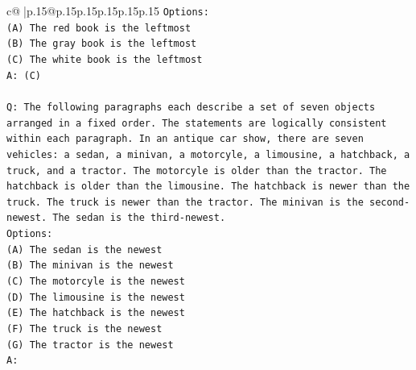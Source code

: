 \documentclass{article}
\begin{document}
{\begin{supertabular}{c@{$\;$}|p{.15\linewidth}@{}p{.15\linewidth}p{.15\linewidth}p{.15\linewidth}p{.15\linewidth}p{.15\linewidth}}
{{{\texttt{Options:} \\
\texttt{(A) The red book is the leftmost} \\
\texttt{(B) The gray book is the leftmost} \\
\texttt{(C) The white book is the leftmost} \\
\texttt{A: (C)} \\
\\ 
\texttt{Q: The following paragraphs each describe a set of seven objects arranged in a fixed order. The statements are logically consistent within each paragraph. In an antique car show, there are seven vehicles: a sedan, a minivan, a motorcyle, a limousine, a hatchback, a truck, and a tractor. The motorcyle is older than the tractor. The hatchback is older than the limousine. The hatchback is newer than the truck. The truck is newer than the tractor. The minivan is the second{-}newest. The sedan is the third{-}newest.} \\
\texttt{Options:} \\
\texttt{(A) The sedan is the newest} \\
\texttt{(B) The minivan is the newest} \\
\texttt{(C) The motorcyle is the newest} \\
\texttt{(D) The limousine is the newest} \\
\texttt{(E) The hatchback is the newest} \\
\texttt{(F) The truck is the newest} \\
\texttt{(G) The tractor is the newest} \\
\texttt{A:} \\
            }
        }
    }
     \\ \\


\end{supertabular}}
\end{document}
